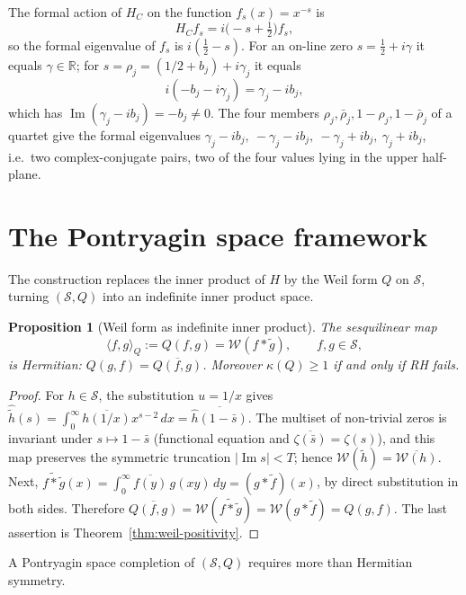 \documentclass[11pt]{amsart}
\newtheorem{proposition}[theorem]{Proposition}
\renewcommand{\Im}{\operatorname{Im}}
\newcommand{\kap}{\kappa}
\newcommand{\Scal}{\mathcal{S}}
\newcommand{\Wcal}{\mathcal{W}}
\begin{document}
The formal action of $H_C$ on the function $f_s(x) = x^{-s}$ is
\[
  H_C f_s = i\bigl(-s+\tfrac12\bigr)f_s,
\]
so the formal eigenvalue of $f_s$ is $i(\tfrac12-s)$.  For an on-line zero
$s=\tfrac12+i\gamma$ it equals $\gamma\in\mathbb R$; for $s = \rho_j = (1/2+b_j)+i\gamma_j$ it
equals
\[
  i(-b_j-i\gamma_j) = \gamma_j - ib_j,
\]
which has $\Im(\gamma_j - ib_j) = -b_j \ne 0$.  The four members
$\rho_j,\bar\rho_j,1-\rho_j,1-\bar\rho_j$ of a quartet give the formal eigenvalues
$\gamma_j-ib_j,\ -\gamma_j-ib_j,\ -\gamma_j+ib_j,\ \gamma_j+ib_j$, i.e.\ two complex-conjugate
pairs, two of the four values lying in the upper half-plane.

\section{The Pontryagin space framework}
\label{sec:pontryagin}

The construction replaces the inner product of $H$ by the Weil form $Q$ on $\Scal$, turning
$(\Scal, Q)$ into an indefinite inner product space.

\begin{proposition}[Weil form as indefinite inner product]\label{prop:indefinite}
The sesquilinear map
\[
  \langle f, g \rangle_Q := Q(f, g) = \Wcal(f * \tilde g),\qquad f,g\in\Scal,
\]
is Hermitian: $Q(g,f)=\overline{Q(f,g)}$.  Moreover $\kap(Q)\ge1$ if and only if RH fails.
\end{proposition}

\begin{proof}
For $h\in\Scal$, the substitution $u=1/x$ gives
$\hat{\tilde h}(s)=\int_0^\infty\overline{h(1/x)}x^{s-2}\,dx=\overline{\hat h(1-\bar s)}$.
The multiset of non-trivial zeros is invariant under $s\mapsto1-\bar s$ (functional equation
and $\overline{\zeta(\bar s)}=\zeta(s)$), and this map preserves the symmetric truncation
$|\Im s|<T$; hence $\Wcal(\tilde h)=\overline{\Wcal(h)}$.  Next,
$\widetilde{f*\tilde g}(x)=\int_0^\infty\overline{f(y)}\,g(xy)\,dy=(g*\tilde f)(x)$, by direct
substitution in both sides.  Therefore
$\overline{Q(f,g)}=\Wcal(\widetilde{f*\tilde g})=\Wcal(g*\tilde f)=Q(g,f)$.  The last assertion
is Theorem~\ref{thm:weil-positivity}.
\end{proof}

A Pontryagin space completion of $(\Scal, Q)$ requires more than Hermitian symmetry.
\end{document}
